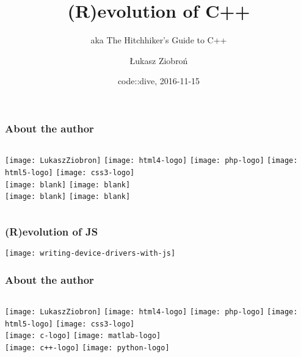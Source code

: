 \author{Łukasz Ziobroń}
\title[Crisis]{(R)evolution of C++}
\date{code::dive, 2016-11-15}
\subject{Computer Science}
\subtitle{aka The Hitchhiker's Guide to C++}

\begin{frame}
\titlepage
\end{frame}

\begin{frame}
  \frametitle{About the author}
  \begin{columns}
      \texttt{[image: LukaszZiobron]}
      \centering
      \texttt{[image: html4-logo]} \pause
      \texttt{[image: php-logo]} \pause
      \texttt{[image: html5-logo]}
      \texttt{[image: css3-logo]} \\
      \texttt{[image: blank]}
      \texttt{[image: blank]} \\
      \texttt{[image: blank]}
      \texttt{[image: blank]}
  \end{columns}
\end{frame}

\begin{frame}
    \frametitle{(R)evolution of JS}
    \centering 
    \texttt{[image: writing-device-drivers-with-js]}
\end{frame}

\begin{frame}
    \frametitle{About the author}
    \begin{columns}
        \texttt{[image: LukaszZiobron]}
        \centering
        \texttt{[image: html4-logo]}
        \texttt{[image: php-logo]}
        \texttt{[image: html5-logo]}
        \texttt{[image: css3-logo]} \\ \pause
        \texttt{[image: c-logo]} \pause
        \texttt{[image: matlab-logo]} \\ \pause
        \texttt{[image: c++-logo]} \pause %
        \texttt{[image: python-logo]}
    \end{columns}
\end{frame}


